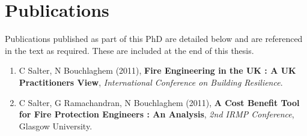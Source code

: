 \documentclass[table,a4paper,oneside]{book}
\begin{document}
\section{Publications}
\label{sec:Publications}

Publications published as part of this PhD are detailed below and are referenced in the text as required. These are included at the end of this thesis.

\begin{enumerate}
	\item C Salter, N Bouchlaghem (2011), \textbf{Fire Engineering in the UK : A UK Practitioners View}, \emph{International Conference on Building Resilience}.
	\item C Salter, G Ramachandran, N Bouchlaghem (2011), \textbf{A Cost Benefit Tool for Fire Protection Engineers : An Analysis}, \emph{2nd IRMP Conference}, Glasgow University.
\end{enumerate}
\end{document}
